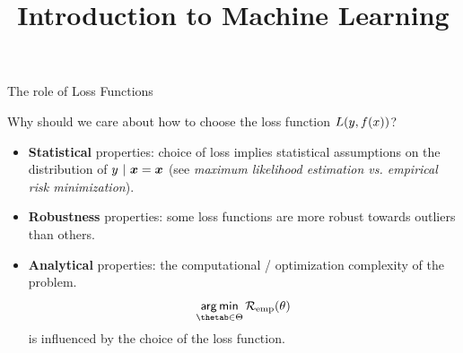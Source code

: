 





\usepackage{booktabs}

\newcommand{\titlefigure}{figure_man/vgg_example.png}
\newcommand{\learninggoals}{
  \item Know the concept of robustness 
  \item Learn about analytical and computational properties of loss functions 
  \item Understand that the loss function may influence convergence of the optimizer
}

\title{Introduction to Machine Learning}
\date{}






\begin{vbframe}{The role of Loss Functions}

Why should we care about how to choose the loss function $L(y, f(x))$?

\begin{itemize}
\item \textbf{Statistical} properties: choice of loss implies statistical assumptions on the distribution of $y ~|~ \bm{x} = \bm{x}$ (see \emph{maximum likelihood estimation vs.
empirical risk minimization}). 
\item \textbf{Robustness} properties: some loss functions are more robust towards outliers than others. 
\item \textbf{Analytical} properties: the computational / optimization complexity of the problem. 
$$
\argmin_{\thetab \in \Theta} \risket
$$
is influenced by the choice of the loss function. 
\end{itemize}

\end{vbframe}

